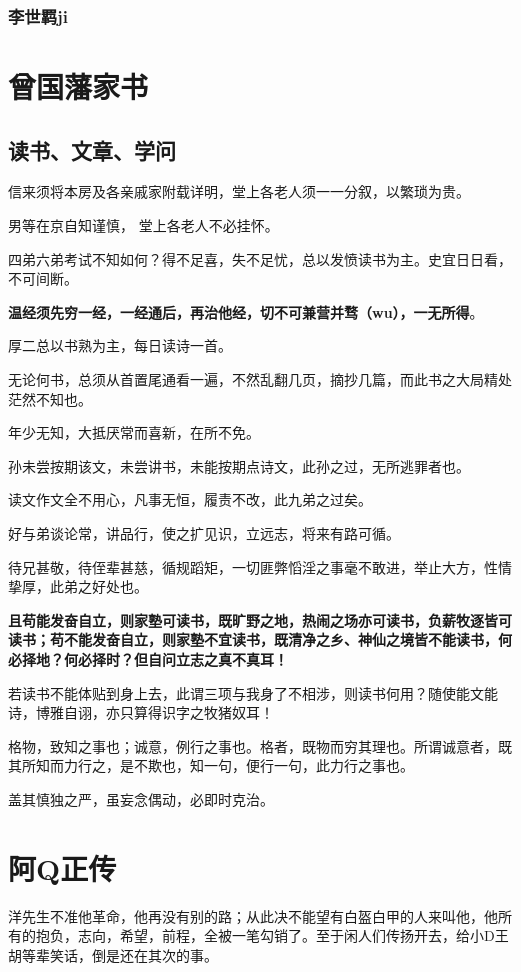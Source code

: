 \documentclass[UTF8,a4paper,8pt]{ctexbook}
\begin{document}
		\subsection{李世羁ji}
	
\chapter{曾国藩家书}
	\section{读书、文章、学问}
		信来须将本房及各亲戚家附载详明，堂上各老人须一一分叙，以繁琐为贵。
		
		男等在京自知谨慎， 堂上各老人不必挂怀。
		
		四弟六弟考试不知如何？得不足喜，失不足忧，总以发愤读书为主。史宜日日看，不可间断。
		
		\textbf{温经须先穷一经，一经通后，再治他经，切不可兼营并骛（wu），一无所得}。
		
		厚二总以书熟为主，每日读诗一首。
		
		无论何书，总须从首置尾通看一遍，不然乱翻几页，摘抄几篇，而此书之大局精处茫然不知也。
		
		年少无知，大抵厌常而喜新，在所不免。
		
		孙未尝按期该文，未尝讲书，未能按期点诗文，此孙之过，无所逃罪者也。
		
		读文作文全不用心，凡事无恒，履责不改，此九弟之过矣。
		
		好与弟谈论常，讲品行，使之扩见识，立远志，将来有路可循。
		
		待兄甚敬，待侄辈甚慈，循规蹈矩，一切匪弊慆淫之事毫不敢进，举止大方，性情挚厚，此弟之好处也。
		
		\textbf{且苟能发奋自立，则家塾可读书，既旷野之地，热闹之场亦可读书，负薪牧逐皆可读书；苟不能发奋自立，则家塾不宜读书，既清净之乡、神仙之境皆不能读书，何必择地？何必择时？但自问立志之真不真耳！}
		
		若读书不能体贴到身上去，此谓三项与我身了不相涉，则读书何用？随使能文能诗，博雅自诩，亦只算得识字之牧猪奴耳！
		
		格物，致知之事也；诚意，例行之事也。格者，既物而穷其理也。所谓诚意者，既其所知而力行之，是不欺也，知一句，便行一句，此力行之事也。
		
		盖其慎独之严，虽妄念偶动，必即时克治。
		
\chapter{阿Q正传}		
	洋先生不准他革命，他再没有别的路；从此决不能望有白盔白甲的人来叫他，他所有的抱负，志向，希望，前程，全被一笔勾销了。至于闲人们传扬开去，给小D王胡等辈笑话，倒是还在其次的事。
\end{document}
